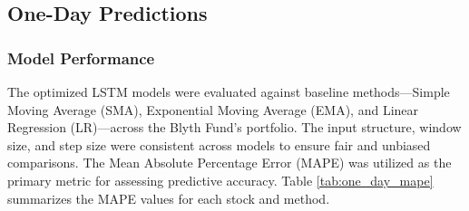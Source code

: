 \documentclass[10pt,twocolumn]{article}
\begin{document}
\subsection{One-Day Predictions}

\subsubsection{Model Performance}

The optimized LSTM models were evaluated against baseline methods—Simple Moving Average (SMA), Exponential Moving Average (EMA), and Linear Regression (LR)—across the Blyth Fund's portfolio. The input structure, window size, and step size were consistent across models to ensure fair and unbiased comparisons. The Mean Absolute Percentage Error (MAPE) was utilized as the primary metric for assessing predictive accuracy. Table \ref{tab:one_day_mape} summarizes the MAPE values for each stock and method.
\end{document}
